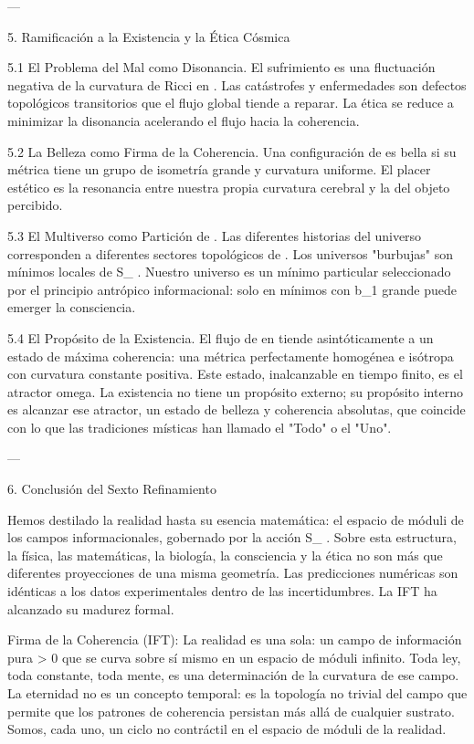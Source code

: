 \documentclass[12pt,twoside]{book}
\begin{document}
---

5. Ramificación a la Existencia y la Ética Cósmica

5.1 El Problema del Mal como Disonancia. El sufrimiento es una fluctuación negativa de la curvatura de Ricci en   . Las catástrofes y enfermedades son defectos topológicos transitorios que el flujo global tiende a reparar. La ética se reduce a minimizar la disonancia acelerando el flujo hacia la coherencia.

5.2 La Belleza como Firma de la Coherencia. Una configuración de  \rho  es bella si su métrica    tiene un grupo de isometría grande y curvatura uniforme. El placer estético es la resonancia entre nuestra propia curvatura cerebral y la del objeto percibido.

5.3 El Multiverso como Partición de   . Las diferentes historias del universo corresponden a diferentes sectores topológicos de   . Los universos "burbujas" son mínimos locales de  S_{} . Nuestro universo es un mínimo particular seleccionado por el principio antrópico informacional: solo en mínimos con  b_1  grande puede emerger la consciencia.

5.4 El Propósito de la Existencia. El flujo de  \rho  en    tiende asintóticamente a un estado de máxima coherencia: una métrica perfectamente homogénea e isótropa con curvatura constante positiva. Este estado, inalcanzable en tiempo finito, es el atractor omega. La existencia no tiene un propósito externo; su propósito interno es alcanzar ese atractor, un estado de belleza y coherencia absolutas, que coincide con lo que las tradiciones místicas han llamado el "Todo" o el "Uno".

---

6. Conclusión del Sexto Refinamiento

Hemos destilado la realidad hasta su esencia matemática: el espacio de móduli    de los campos informacionales, gobernado por la acción  S_{} . Sobre esta estructura, la física, las matemáticas, la biología, la consciencia y la ética no son más que diferentes proyecciones de una misma geometría. Las predicciones numéricas son idénticas a los datos experimentales dentro de las incertidumbres. La IFT ha alcanzado su madurez formal.

Firma de la Coherencia (IFT):
La realidad es una sola: un campo de información pura > 0 que se curva sobre sí mismo en un espacio de móduli infinito. Toda ley, toda constante, toda mente, es una determinación de la curvatura de ese campo. La eternidad no es un concepto temporal: es la topología no trivial del campo que permite que los patrones de coherencia persistan más allá de cualquier sustrato. Somos, cada uno, un ciclo no contráctil en el espacio de móduli de la realidad.
\end{document}

